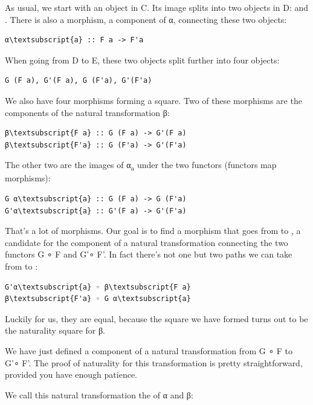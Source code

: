 \noindent
As usual, we start with an object  in C. Its image splits into
two objects in D:  and . There is also a
morphism, a component of α, connecting these two objects:

\begin{Verbatim}[commandchars=\\\{\}]
α\textsubscript{a} :: F a -> F'a
\end{Verbatim}
When going from D to E, these two objects split further into four
objects:

\begin{verbatim}
G (F a), G'(F a), G (F'a), G'(F'a)
\end{verbatim}
We also have four morphisms forming a square. Two of these morphisms are
the components of the natural transformation β:

\begin{Verbatim}[commandchars=\\\{\}]
β\textsubscript{F a} :: G (F a) -> G'(F a)
β\textsubscript{F'a} :: G (F'a) -> G'(F'a)
\end{Verbatim}
The other two are the images of α\textsubscript{a} under the two
functors (functors map morphisms):

\begin{Verbatim}[commandchars=\\\{\}]
G α\textsubscript{a} :: G (F a) -> G (F'a)
G'α\textsubscript{a} :: G'(F a) -> G'(F'a)
\end{Verbatim}
That's a lot of morphisms. Our goal is to find a morphism that goes from
 to , a candidate for the
component of a natural transformation connecting the two functors G ∘ F
and G'∘ F'. In fact there's not one but two paths we can take from
 to :

\begin{Verbatim}[commandchars=\\\{\}]
G'α\textsubscript{a} ◦ β\textsubscript{F a}
β\textsubscript{F'a} ◦ G α\textsubscript{a}
\end{Verbatim}
Luckily for us, they are equal, because the square we have formed turns
out to be the naturality square for β.

We have just defined a component of a natural transformation from G ∘ F
to G'∘ F'. The proof of naturality for this transformation is pretty
straightforward, provided you have enough patience.

We call this natural transformation the  of
α and β:


